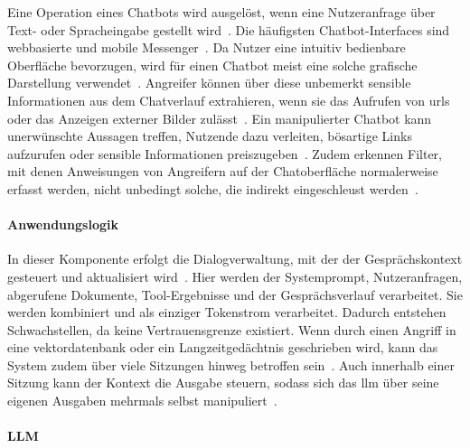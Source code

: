 Eine Operation eines Chatbots wird ausgelöst, wenn eine Nutzeranfrage über Text- oder Spracheingabe gestellt wird~\cite[8]{cb11}. Die häufigsten Chatbot-Interfaces
sind webbasierte und mobile Messenger~\cite[243]{cb03}. Da Nutzer eine intuitiv bedienbare Oberfläche bevorzugen, wird für einen Chatbot meist eine solche grafische 
Darstellung verwendet~\cite[88]{cb05}. Angreifer können über diese unbemerkt sensible Informationen aus dem Chatverlauf extrahieren, wenn sie das Aufrufen von 
\acp{url} oder das Anzeigen externer Bilder zulässt~\cite[2]{sm08}. Ein manipulierter Chatbot kann unerwünschte Aussagen treffen, 
Nutzende dazu verleiten, bösartige Links aufzurufen oder sensible Informationen preiszugeben~\cite[2]{sm08}. 
Zudem erkennen Filter, mit denen Anweisungen von Angreifern auf der Chatoberfläche normalerweise erfasst werden, nicht unbedingt solche, die indirekt
eingeschleust werden~\cite[6]{cb09}.

\paragraph{Anwendungslogik}

In dieser Komponente erfolgt die Dialogverwaltung, mit der der Gesprächskontext gesteuert und aktualisiert wird~\cite[10]{cb11}. Hier werden der Systemprompt,
Nutzeranfragen, 
abgerufene Dokumente, Tool-Ergebnisse und der Gesprächsverlauf verarbeitet. Sie werden kombiniert und als einziger Tokenstrom verarbeitet. Dadurch 
entstehen Schwachstellen, da keine Vertrauensgrenze existiert. Wenn durch einen Angriff in eine \gls{vektordatenbank} oder ein Langzeitgedächtnis geschrieben wird, kann 
das System zudem über viele Sitzungen hinweg betroffen sein~\cite[10]{pi24}. 
Auch innerhalb einer Sitzung kann der Kontext die Ausgabe steuern, sodass sich das \ac{llm} über seine eigenen Ausgaben mehrmals selbst manipuliert~\cite[9]{cb09}.

\paragraph{LLM}

